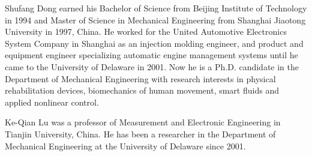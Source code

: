 
\begin{biography}{Shufang Dong}
earned his Bachelor of Science from Beijing Institute of Technology in 1994 and Master of Science in Mechanical Engineering from Shanghai Jiaotong University in 1997, China. He worked for the United Automotive Electronics System Company in Shanghai as an injection molding engineer, and product and equipment engineer specializing automatic engine management systems until he came to the University of Delaware in 2001. Now he is a Ph.D. candidate in the Department of Mechanical Engineering with research interests in physical rehabilitation devices, biomechanics of human movement, smart fluids and applied nonlinear control.
\end{biography}

\begin{biography}{Ke-Qian Lu}
was a professor of Measurement and Electronic Engineering in Tianjin University, China. 
He has been a researcher in the Department of Mechanical Engineering at the University of Delaware since 2001.
\end{biography}


